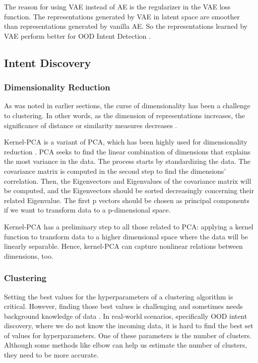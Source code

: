 \documentclass{article}
\begin{document}
The reason for using VAE instead of AE is the regularizer in the VAE loss function.
The representations generated by VAE in latent space are smoother than representations generated by vanilla AE.
So the representations learned by VAE perform better for OOD Intent Detection \citep{an2015variational}.

\subsection{Intent Discovery}

\subsubsection{Dimensionality Reduction}

As was noted in earlier sections, the curse of dimensionality has been a challenge to clustering. 
In other words, as the dimension of representations increases, the significance of distance or similarity measures decreases \citep{10.1007/3-540-44503-X_27}.

Kernel-PCA is a variant of PCA, which has been highly used for dimensionality reduction \citep{10.1007/BFb0020217}. 
PCA seeks to find the linear combination of dimensions that explains the most variance in the data. 
The process starts by standardizing the data. The covariance matrix is computed in the second step to find the dimensions' correlation. 
Then, the Eigenvectors and Eigenvalues of the covariance matrix will be computed, and the Eigenvectors should be sorted decreasingly concerning their related Eigenvalue. 
The first p vectors should be chosen as principal components if we want to transform data to a p-dimensional space.

Kernel-PCA has a preliminary step to all those related to PCA: 
applying a kernel function to transform data to a higher dimensional space where the data will be linearly separable. 
Hence, kernel-PCA can capture nonlinear relations between dimensions, too.

\subsubsection{Clustering}

\noindent Setting the best values for the hyperparameters of a clustering algorithm is critical. 
However, finding those best values is challenging and sometimes needs background knowledge of data \citep{van2017constraint}.
In real-world scenarios, specifically OOD intent discovery, where we do not know the incoming data, 
it is hard to find the best set of values for hyperparameters. 
One of these parameters is the number of clusters. 
Although some methods like elbow can help us estimate the number of clusters, they need to be more accurate.
\end{document}
